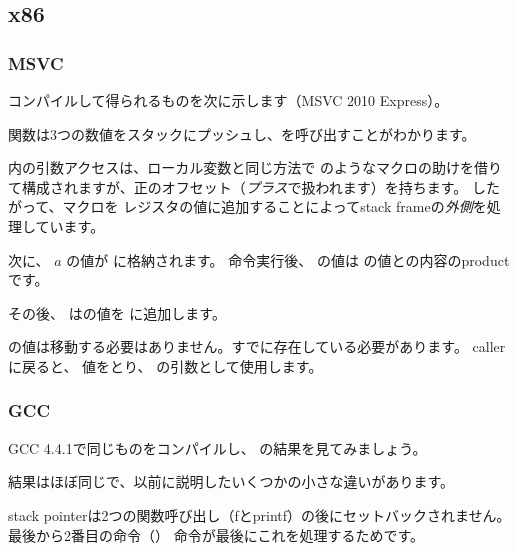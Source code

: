 \subsection{x86}

\subsubsection{MSVC}

コンパイルして得られるものを次に示します（MSVC 2010 Express）。




\main 関数は3つの数値をスタックにプッシュし、を呼び出すことがわかります。

\ttf 内の引数アクセスは、ローカル変数と同じ方法で
のようなマクロの助けを借りて構成されますが、正のオフセット（\emph{プラス}で扱われます）を持ちます。 
したがって、マクロを \EBP レジスタの値に追加することによって\gls{stack frame}の\emph{外側}を処理しています。


次に、 $a$ の値が \EAX に格納されます。 \IMUL 命令実行後、 
\EAX の値は \EAX の値との内容の\gls{product}です。

その後、 \ADD はの値を \EAX に追加します。

\EAX の値は移動する必要はありません。すでに存在している必要があります。 
\gls{caller}に戻ると、 \EAX 値をとり、 \printf の引数として使用します。



\subsubsection{GCC}

GCC 4.4.1で同じものをコンパイルし、 \IDA の結果を見てみましょう。



結果はほぼ同じで、以前に説明したいくつかの小さな違いがあります。

\gls{stack pointer}は2つの関数呼び出し（fとprintf）の後にセットバックされません。
最後から2番目の命令（）
命令が最後にこれを処理するためです。
